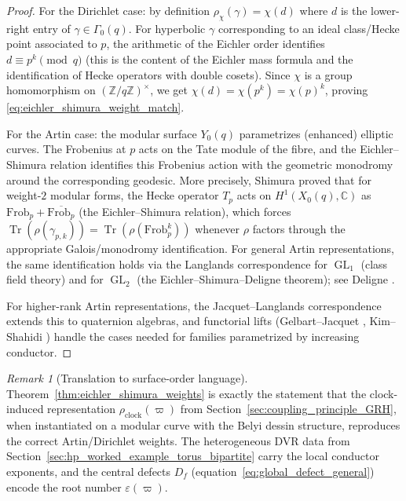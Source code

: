 \documentclass[11pt,oneside]{amsbook}
\numberwithin{equation}{section}
\theoremstyle{plain}
\theoremstyle{definition}
\theoremstyle{remark}
\newtheorem{remark}[theorem]{Remark}
\newcommand{\Z}{\mathbb{Z}}
\newcommand{\C}{\mathbb{C}}
\DeclareMathOperator{\Tr}{\mathrm{Tr}}
\DeclareMathOperator{\GL}{\mathrm{GL}}
\begin{document}
\begin{proof}
For the Dirichlet case: by definition $\rho_\chi(\gamma)=\chi(d)$ where $d$ is the lower-right entry of $\gamma\in\Gamma_0(q)$.
For hyperbolic $\gamma$ corresponding to an ideal class/Hecke point associated to $p$, the arithmetic of the Eichler order identifies $d\equiv p^k\pmod{q}$ (this is the content of the Eichler mass formula and the identification of Hecke operators with double cosets).
Since $\chi$ is a group homomorphism on $(\Z/q\Z)^\times$, we get $\chi(d)=\chi(p^k)=\chi(p)^k$, proving \eqref{eq:eichler_shimura_weight_match}.

For the Artin case: the modular surface $Y_0(q)$ parametrizes (enhanced) elliptic curves.
The Frobenius at $p$ acts on the Tate module of the fibre, and the Eichler--Shimura relation identifies this Frobenius action with the geometric monodromy around the corresponding geodesic.
More precisely, Shimura \cite{Shimura1971ArithmeticModularFunctions} proved that for weight-$2$ modular forms, the Hecke operator $T_p$ acts on $H^1(X_0(q),\C)$ as $\mathrm{Frob}_p+\overline{\mathrm{Frob}_p}$ (the Eichler--Shimura relation), which forces $\Tr(\rho(\gamma_{p,k}))=\Tr(\rho(\mathrm{Frob}_p^k))$ whenever $\rho$ factors through the appropriate Galois/monodromy identification.
For general Artin representations, the same identification holds via the Langlands correspondence for $\GL_1$ (class field theory) and for $\GL_2$ (the Eichler--Shimura--Deligne theorem); see Deligne \cite{Deligne1971FormeModulaires}.

For higher-rank Artin representations, the Jacquet--Langlands correspondence \cite{JacquetLanglands1970GL2} extends this to quaternion algebras, and functorial lifts (Gelbart--Jacquet \cite{GelbartJacquet1978GL3}, Kim--Shahidi \cite{KimShahidi2002GL4}) handle the cases needed for families parametrized by increasing conductor.
\end{proof}

\begin{remark}[Translation to surface-order language]
Theorem~\ref{thm:eichler_shimura_weights} is exactly the statement that the clock-induced representation $\rho_{\mathrm{clock}}(\varpi)$ from Section~\ref{sec:coupling_principle_GRH}, when instantiated on a modular curve with the Belyi dessin structure, reproduces the correct Artin/Dirichlet weights.
The heterogeneous DVR data from Section~\ref{sec:hp_worked_example_torus_bipartite} carry the local conductor exponents, and the central defects $D_f$ (equation~\eqref{eq:global_defect_general}) encode the root number $\varepsilon(\varpi)$.
\end{remark}
\end{document}

